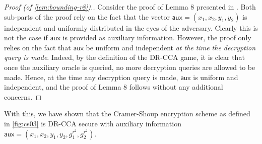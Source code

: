 \documentclass[10pt,a4paper]{article}
\newcommand{\aux}{\mathsf{aux}}
\begin{document}
	\begin{proof}[Proof (of \cref{lem:bounding-r8}).]
		Consider the proof of Lemma $8$ presented in \cite{cs01}. Both sub-parts of the proof rely on the fact that the vector $\aux = (x_1,x_2,y_1,y_2)$ is independent and uniformly distributed in the eyes of the adversary. Clearly this is not the case if $\aux$ is provided as auxiliary information. However, the proof only relies on the fact that $\aux$ be uniform and independent \textit{at the time the decryption query is made}. Indeed, by the definition of the DR-CCA game, it is clear that once the auxiliary oracle is queried, no more decryption queries are allowed to be made. Hence, at the time any decryption query is made, $\aux$ is uniform and independent, and the proof of Lemma $8$ follows without any additional concerns.
	\end{proof}
	
	With this, we have shown that the Cramer-Shoup encryption scheme as defined in \cref{fig:cs03} is DR-CCA secure with auxiliary information $\aux = (x_1,x_2,y_1,y_2, g_1^{r^2}, g_2^{r^2})$.
	
	
	
	
	
	
	
	
	
	
	
	
	
	
	
\end{document}
